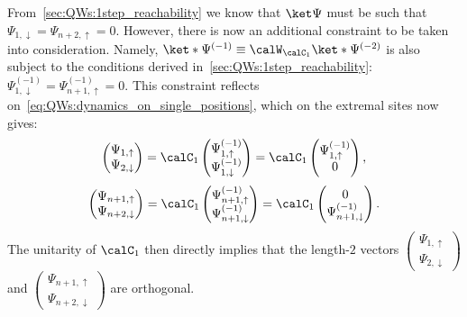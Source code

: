 From~\cref{sec:QWs:1step_reachability} we know that $\ket\Psi$ must be such that
$\Psi_{1,\downarrow}=\Psi_{n+2,\uparrow}=0$.
However, there is now an additional constraint to be taken into consideration. Namely, $\ket*{\Psi^{(-1)}}\equiv\calW_{\calC_1}\ket*{\Psi^{(-2)}}$ is also subject to the conditions derived in~\cref{sec:QWs:1step_reachability}:
$\Psi^{(-1)}_{1,\downarrow}=\Psi^{(-1)}_{n+1,\uparrow}=0$.
This constraint reflects on~\cref{eq:QWs:dynamics_on_single_positions}, which on the extremal sites now gives:
\begin{equation}
    \begin{pmatrix}
        \Psi_{1,\uparrow} \\
        \Psi_{2,\downarrow}
    \end{pmatrix} =
    \calC_1
    \begin{pmatrix}
        \Psi^{(-1)}_{1,\uparrow} \\
        \Psi^{(-1)}_{1,\downarrow}
    \end{pmatrix} =
    \calC_1
    \begin{pmatrix}
        \Psi^{(-1)}_{1,\uparrow} \\ 0
    \end{pmatrix},
\end{equation}
\begin{equation}
    \begin{pmatrix}
        \Psi_{n+1,\uparrow} \\
        \Psi_{n+2,\downarrow}
    \end{pmatrix} =
    \calC_1
    \begin{pmatrix}
        \Psi^{(-1)}_{n+1,\uparrow} \\
        \Psi^{(-1)}_{n+1,\downarrow}
    \end{pmatrix} =
    \calC_1
    \begin{pmatrix}
        0 \\
        \Psi^{(-1)}_{n+1,\downarrow}
    \end{pmatrix}.
\end{equation}
The unitarity of $\calC_1$ then directly implies that the length-$2$ vectors
$\begin{pmatrix}
    \Psi_{1,\uparrow} \\
    \Psi_{2,\downarrow}
\end{pmatrix}$
and
$\begin{pmatrix}
    \Psi_{n+1,\uparrow} \\
    \Psi_{n+2,\downarrow}
\end{pmatrix}$
are orthogonal.
